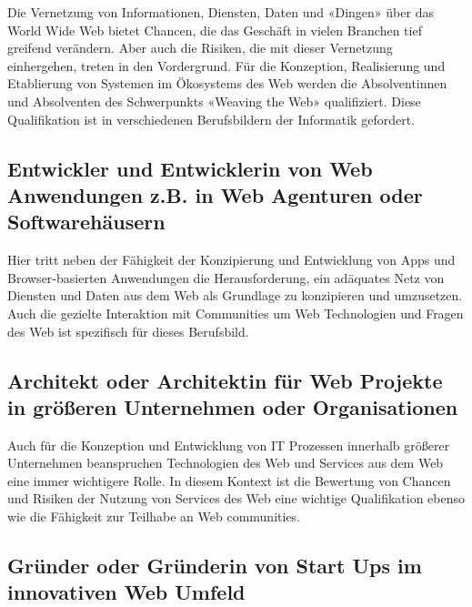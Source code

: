 Die Vernetzung von Informationen, Diensten, Daten und «Dingen» über das
World Wide Web bietet Chancen, die das Geschäft in vielen Branchen tief
greifend verändern. Aber auch die Risiken, die mit dieser Vernetzung
einhergehen, treten in den Vordergrund. Für die Konzeption, Realisierung
und Etablierung von Systemen im Ökosystems des Web werden die
Absolventinnen und Absolventen des Schwerpunkts «Weaving the Web»
qualifiziert. Diese Qualifikation ist in verschiedenen Berufsbildern der
Informatik gefordert.

\subsection*{Entwickler und Entwicklerin von Web Anwendungen z.B. in
Web Agenturen oder
Softwarehäusern\label{/mi-2017/modulbeschreibungen-master/schwerpunkt-weaving-the-web}}\label{entwickler-und-entwicklerin-von-web-anwendungen-z.b.-in-web-agenturen-oder-softwarehuxe4usernpathlabelmi-2017modulbeschreibungen-masterschwerpunkt-weaving-the-web}

Hier tritt neben der Fähigkeit der Konzipierung und Entwicklung von Apps
und Browser-basierten Anwendungen die Herausforderung, ein adäquates
Netz von Diensten und Daten aus dem Web als Grundlage zu konzipieren und
umzusetzen. Auch die gezielte Interaktion mit Communities um Web
Technologien und Fragen des Web ist spezifisch für dieses Berufsbild.

\subsection*{Architekt oder Architektin für Web Projekte in größeren
Unternehmen oder
Organisationen\label{/mi-2017/modulbeschreibungen-master/schwerpunkt-weaving-the-web}}\label{architekt-oder-architektin-fuxfcr-web-projekte-in-gruxf6uxdferen-unternehmen-oder-organisationenpathlabelmi-2017modulbeschreibungen-masterschwerpunkt-weaving-the-web}

Auch für die Konzeption und Entwicklung von IT Prozessen innerhalb
größerer Unternehmen beanspruchen Technologien des Web und Services aus
dem Web eine immer wichtigere Rolle. In diesem Kontext ist die Bewertung
von Chancen und Risiken der Nutzung von Services des Web eine wichtige
Qualifikation ebenso wie die Fähigkeit zur Teilhabe an Web communities.

\subsection*{Gründer oder Gründerin von Start Ups im innovativen Web
Umfeld\label{/mi-2017/modulbeschreibungen-master/schwerpunkt-weaving-the-web}}\label{gruxfcnder-oder-gruxfcnderin-von-start-ups-im-innovativen-web-umfeldpathlabelmi-2017modulbeschreibungen-masterschwerpunkt-weaving-the-web}

